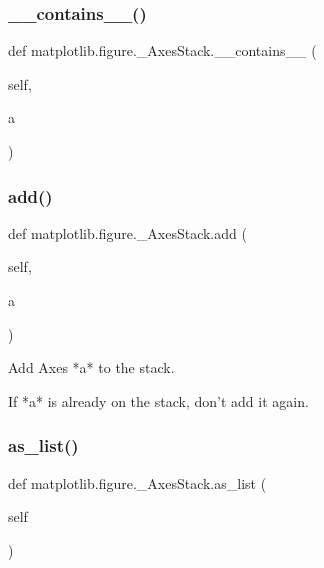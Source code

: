 \subsubsection{\texorpdfstring{\+\_\+\+\_\+contains\+\_\+\+\_\+()}{\_\_contains\_\_()}}
{\footnotesize\ttfamily def matplotlib.\+figure.\+\_\+\+Axes\+Stack.\+\_\+\+\_\+contains\+\_\+\+\_\+ (\begin{DoxyParamCaption}\item[{}]{self,  }\item[{}]{a }\end{DoxyParamCaption})}

\mbox{\label{classmatplotlib_1_1figure_1_1__AxesStack_ae1d6a33592ea671daf55189c7b61a842}} 
\subsubsection{\texorpdfstring{add()}{add()}}
{\footnotesize\ttfamily def matplotlib.\+figure.\+\_\+\+Axes\+Stack.\+add (\begin{DoxyParamCaption}\item[{}]{self,  }\item[{}]{a }\end{DoxyParamCaption})}

\begin{DoxyVerb}Add Axes *a* to the stack.

If *a* is already on the stack, don't add it again.
\end{DoxyVerb}
 \mbox{\label{classmatplotlib_1_1figure_1_1__AxesStack_a49363361c2f7d876e6b9d54951804c21}} 
\subsubsection{\texorpdfstring{as\+\_\+list()}{as\_list()}}
{\footnotesize\ttfamily def matplotlib.\+figure.\+\_\+\+Axes\+Stack.\+as\+\_\+list (\begin{DoxyParamCaption}\item[{}]{self }\end{DoxyParamCaption})}

